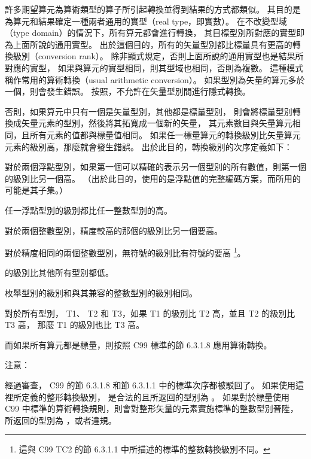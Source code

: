 許多期望算元為算術類型的算子所引起轉換並得到結果的方式都類似。
其目的是為算元和結果確定一種兩者通用的實型（real type，即實數）。
在不改變型域（type domain）的情況下，所有算元都會進行轉換，
其目標型別所對應的實型即為上面所說的通用實型。
出於這個目的，所有的矢量型別都比標量具有更高的轉換級別（conversion rank）。
除非顯式規定，否則上面所說的通用實型也是結果所對應的實型，
如果與算元的實型相同，則其型域也相同，否則為複數。
這種模式稱作常用的算術轉換（usual arithmetic conversion）。
如果型別為矢量的算元多於一個，則會發生錯誤。
按照，不允許在矢量型別間進行隱式轉換。

否則，如果算元中只有一個是矢量型別，其他都是標量型別，
則會將標量型別轉換成矢量元素的型別，然後將其拓寬成一個新的矢量，
其元素數目與矢量算元相同，且所有元素的值都與標量值相同。
如果任一標量算元的轉換級別比矢量算元元素的級別高，那麼就會發生錯誤。
出於此目的，轉換級別的次序定義如下：
\startigNum
\item 對於兩個浮點型別，如果第一個可以精確的表示另一個型別的所有數值，則第一個的級別比另一個高。
（出於此目的，使用的是浮點值的完整編碼方案，而所用的可能是其子集。）

\item 任一浮點型別的級別都比任一整數型別的高。

\item 對於兩個整數型別，精度較高的那個的級別比另一個要高。

\item 對於精度相同的兩個整數型別，無符號的級別比有符號的要高
\footnote{這與 C99 TC2 的節 6.3.1.1 中所描述的標準的整數轉換級別不同。}。

\item {} 的級別比其他所有型別都低。

\item 枚舉型別的級別和與其兼容的整數型別的級別相同。

\item 對於所有型別， T1、 T2 和 T3，如果 T1 的級別比 T2 高，並且 T2 的級別比 T3 高，
那麼 T1 的級別也比 T3 高。
\stopigNum

而如果所有算元都是標量，則按照 C99 標準的節 6.3.1.8 應用算術轉換。

注意：

經過審查， C99 的節 6.3.1.8 和節 6.3.1.1 中的標準次序都被駁回了。
如果使用這裡所定義的整形轉換級別，  是合法的且所返回的型別為 。
如果對於標量使用 C99 中標準的算術轉換規則，則會對整形矢量的元素實施標準的整數型別晉陞，
  所返回的型別為 ，或者違規。

